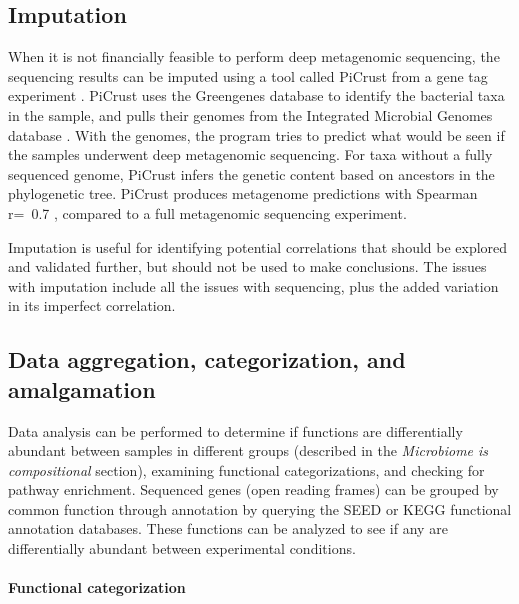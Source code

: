 \subsection{Imputation}
When it is not financially feasible to perform deep metagenomic sequencing, the sequencing results can be imputed using a tool called PiCrust from a gene tag experiment \cite{langille2013predictive}. PiCrust uses the Greengenes database \cite{desantis2006greengenes} to identify the bacterial taxa in the sample, and pulls their genomes from the Integrated Microbial Genomes database \cite{markowitz2012img}. With the genomes, the program tries to predict what would be seen if the samples underwent deep metagenomic sequencing. For taxa without a fully sequenced genome, PiCrust infers the genetic content based on ancestors in the phylogenetic tree. PiCrust produces metagenome predictions with Spearman r=~0.7 \cite{langille2013predictive}, compared to a full metagenomic sequencing experiment.

Imputation is useful for identifying potential correlations that should be explored and validated further, but should not be used to make conclusions. The issues with imputation include all the issues with sequencing, plus the added variation in its imperfect correlation.

\subsection{Data aggregation, categorization, and amalgamation}
Data analysis can be performed to determine if functions are differentially abundant between samples in different groups (described in the \textit{Microbiome is compositional} section), examining functional categorizations, and checking for pathway enrichment. Sequenced genes (open reading frames) can be grouped by common function through annotation by querying the SEED or KEGG functional annotation databases. These functions can be analyzed to see if any are differentially abundant between experimental conditions.

\paragraph{Functional categorization}\mbox{}\\

